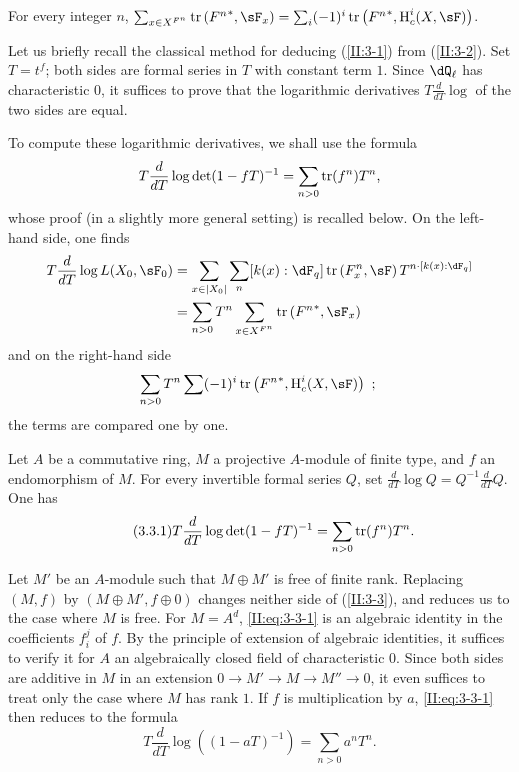 \begin{theorem_}\label{II:3-2}
For every integer $n$,
$\sum_{x\in X^{F^n}} \tr\left({F^n}^*,\sF_x\right) = \sum_i (-1)^i \tr\left({F^n}^*,\h_c^i(X,\sF)\right)$.
\end{theorem_}






Let us briefly recall the classical method for deducing (\ref{II:3-1}) from
(\ref{II:3-2}). Set $T=t^f$; both sides are formal series in $T$ with
constant term $1$. Since $\dQ_\ell$ has characteristic $0$, it suffices to
prove that the logarithmic derivatives $T\frac{d}{dT}\log$ of the two sides
are equal.

To compute these logarithmic derivatives, we shall use the formula
\[
  T \frac{d}{dT}\log\det(1-f T)^{-1} = \sum_{n>0} \operatorname{tr}(f^n) T^n \text{,}
\]
whose proof (in a slightly more general setting) is recalled below. On the
left-hand side, one finds
\begin{align*}
  T\frac{d}{dT}\log L(X_0,\sF_0)
    &= \sum_{x\in |X_0|} \sum_n [k(x):\dF_q] \tr\left(F_x^n,\sF\right) T^{n\cdot[k(x):\dF_q]} \\
    &= \sum_{n>0} T^n \sum_{x\in X^{F^n}} \tr\left({F^n}^*,\sF_x\right)
\end{align*}
and on the right-hand side
\[
  \sum_{n>0} T^n \sum (-1)^i \tr\left({F^n}^*,\h_c^i(X,\sF)\right) \text{ ; }
\]
the terms are compared one by one.






\begin{proposition_}\label{II:3-3}
Let $A$ be a commutative ring, $M$ a projective $A$-module of finite type,
and $f$ an endomorphism of $M$. For every invertible formal series $Q$, set
$\frac{d}{dT}\log Q = Q^{-1}\frac{d}{dT}Q$. One has
\begin{equation*}\tag{3.3.1}\label{II:eq:3-3-1}
  T\frac{d}{dT}\log\det(1-f T)^{-1} = \sum_{n>0} \operatorname{tr}(f^n) T^n \text{.}
\end{equation*}
\end{proposition_}

Let $M'$ be an $A$-module such that $M\oplus M'$ is free of finite rank.
Replacing $(M,f)$ by $(M\oplus M',f\oplus 0)$ changes neither side of
(\ref{II:3-3}), and reduces us to the case where $M$ is free. For $M=A^d$,
\eqref{II:eq:3-3-1} is an algebraic identity in the coefficients $f_i^j$ of
$f$. By the principle of extension of algebraic identities, it suffices to
verify it for $A$ an algebraically closed field of characteristic $0$. Since
both sides are additive in $M$ in an extension
$0\to M'\to M\to M''\to 0$, it even suffices to treat only the case where
$M$ has rank $1$. If $f$ is multiplication by $a$,
\eqref{II:eq:3-3-1} then reduces to the formula
\[
  T\frac{d}{dT}\log\left((1-a T)^{-1}\right) = \sum_{n>0} a^n T^n \text{.}
\]






